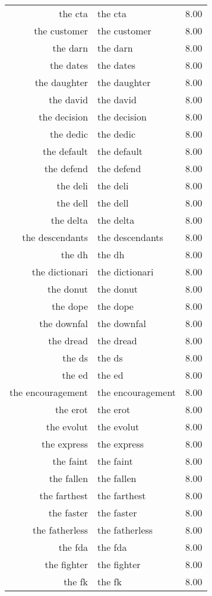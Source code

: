 \begin{table}[ht]
\begin{tabular}{rlr}
  the cta & the cta & 8.00 \\ 
  the customer & the customer & 8.00 \\ 
  the darn & the darn & 8.00 \\ 
  the dates & the dates & 8.00 \\ 
  the daughter & the daughter & 8.00 \\ 
  the david & the david & 8.00 \\ 
  the decision & the decision & 8.00 \\ 
  the dedic & the dedic & 8.00 \\ 
  the default & the default & 8.00 \\ 
  the defend & the defend & 8.00 \\ 
  the deli & the deli & 8.00 \\ 
  the dell & the dell & 8.00 \\ 
  the delta & the delta & 8.00 \\ 
  the descendants & the descendants & 8.00 \\ 
  the dh & the dh & 8.00 \\ 
  the dictionari & the dictionari & 8.00 \\ 
  the donut & the donut & 8.00 \\ 
  the dope & the dope & 8.00 \\ 
  the downfal & the downfal & 8.00 \\ 
  the dread & the dread & 8.00 \\ 
  the ds & the ds & 8.00 \\ 
  the ed & the ed & 8.00 \\ 
  the encouragement & the encouragement & 8.00 \\ 
  the erot & the erot & 8.00 \\ 
  the evolut & the evolut & 8.00 \\ 
  the express & the express & 8.00 \\ 
  the faint & the faint & 8.00 \\ 
  the fallen & the fallen & 8.00 \\ 
  the farthest & the farthest & 8.00 \\ 
  the faster & the faster & 8.00 \\ 
  the fatherless & the fatherless & 8.00 \\ 
  the fda & the fda & 8.00 \\ 
  the fighter & the fighter & 8.00 \\ 
  the fk & the fk & 8.00 \\ 

\end{tabular}
\end{table}
